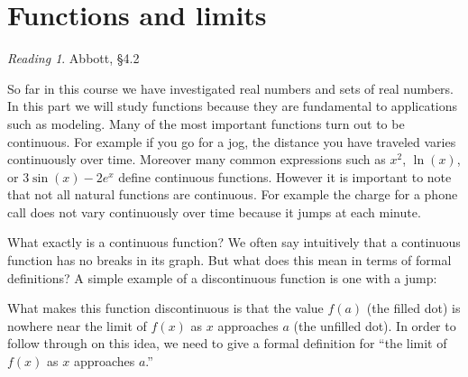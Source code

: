 \documentclass[11pt,oneside]{amsbook}
\theoremstyle{definition}
\theoremstyle{plain}
\theoremstyle{definition}
\theoremstyle{remark}
\newtheorem*{reading}{Reading}
\numberwithin{equation}{section}
\numberwithin{figure}{section}
\begin{document}
\section{Functions and limits}

\begin{reading}
  Abbott, \S 4.2
\end{reading}

So far in this course we have investigated real numbers and sets of real numbers. In this part we will study functions because they are fundamental to applications such as modeling. Many of the most important functions turn out to be continuous. For example if you go for a jog, the distance you have traveled varies continuously over time. Moreover many common expressions such as $x^2$, $\ln(x)$, or $3\sin(x)-2e^x$ define continuous functions. However it is important to note that not all natural functions are continuous. For example the charge for a phone call does not vary continuously over time because it jumps at each minute.

What exactly is a continuous function? We often say intuitively that a continuous function has no breaks in its graph. But what does this mean in terms of formal definitions? A simple example of a discontinuous function is one with a jump:
\begin{center}
\end{center}
What makes this function discontinuous is that the value $f(a)$ (the filled dot) is nowhere near the limit of $f(x)$ as $x$ approaches $a$ (the unfilled dot). In order to follow through on this idea, we need to give a formal definition for ``the limit of $f(x)$ as $x$ approaches $a$.''


\end{document}
